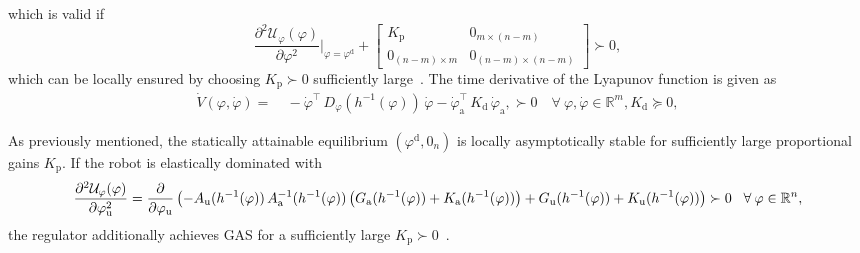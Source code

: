 which is valid if
\begin{equation}
    \frac{\partial^2 \mathcal{U}_\varphi(\varphi)}{\partial \varphi^2} \Bigg |_{\varphi = \varphi^\mathrm{d}} + \begin{bmatrix}
        K_\mathrm{p} & 0_{m \times (n-m)}\\
        0_{(n-m) \times m} & 0_{(n-m) \times (n-m)}
    \end{bmatrix} \succ 0,
\end{equation}
which can be locally ensured by choosing $K_\mathrm{p} \succ 0$ sufficiently large~\citep{pustina2025analysis}.
The time derivative of the Lyapunov function is given as
\begin{equation}
\begin{split}
    \dot{V}(\varphi,\dot{\varphi}) 
    =& \: -\dot{\varphi}^\top \, D_\varphi(h^{-1}(\varphi)) \, \dot{\varphi} - \dot{\varphi}_\mathrm{a}^\top \, K_\mathrm{d} \, \dot{\varphi}_\mathrm{a}, \succ 0 \quad \forall \: \varphi,\dot{\varphi} \in \mathbb{R}^{m}, K_\mathrm{d} \succeq 0,
\end{split}
\end{equation}

As previously mentioned, the statically attainable equilibrium $(\varphi^\mathrm{d},0_n)$ is locally asymptotically stable for sufficiently large proportional gains $K_\mathrm{p}$.
If the robot is elastically dominated with
\begin{equation}\footnotesize
    \frac{\partial^2 \mathcal{U}_\varphi(\varphi)}{\partial \varphi_\mathrm{u}^2} = \frac{\partial}{\partial \varphi_\mathrm{u}} \left ( -A_\mathrm{u}(h^{-1}(\varphi)) \, A_\mathrm{a}^{-1}(h^{-1}(\varphi)) \left ( G_\mathrm{a}(h^{-1}(\varphi)) + K_\mathrm{a}(h^{-1}(\varphi)) \right ) + G_\mathrm{u}(h^{-1}(\varphi)) + K_\mathrm{u}(h^{-1}(\varphi)) \right ) \succ 0 \quad \forall \: \varphi \in \mathbb{R}^n,
\end{equation}
the regulator additionally achieves \gls{GAS} for a sufficiently large $K_\mathrm{p} \succ 0$~\citep{pustina2025analysis}.

